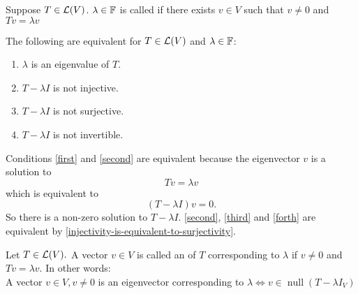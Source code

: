 \begin{mydef} [eigenvalue]
  Suppose $T\in \mathcal{L} (V)$. $\lambda \in \mathbb{F}$ is called  if there exists $v \in V$ such that $v \neq 0$ and $Tv = \lambda v$
\end{mydef}

\setcounter{thm}{6}
\begin{thm} 
  \label{thm: equivalent conditions to be an eigenvalue}
  The following are equivalent for $T \in \mathcal{L}(V)$ and $\lambda \in \mathbb{F}$:
  \begin{enumerate}[label=\textbf{(\alph*)}]
    \item $\lambda$ is an eigenvalue of $T$. \label{first}
    \item $T-\lambda I$ is not injective. \label{second}
    \item $T-\lambda I$ is not surjective. \label{third}
    \item $T-\lambda I$ is not invertible. \label{forth}
  \end{enumerate}
\end{thm}
\begin{prf}
  Conditions \ref{first} and \ref{second} are equivalent because the eigenvector $v$ is a solution to
  \begin{equation}
    Tv=\lambda v
  \end{equation} which is equivalent to
  \begin{equation}
    (T-\lambda I)v=0.
  \end{equation} So there is a non-zero solution to $T-\lambda I$.
  \ref{second}, \ref{third} and \ref{forth} are equivalent by \ref{injectivity-is-equivalent-to-surjectivity}.
\end{prf}

\setcounter{thm}{7}
\begin{mydef} [eigenvector]
  Let $T\in \mathcal{L}(V).$ A vector $v \in V$ is called an  of $T$ corresponding to $\lambda$ if $v\neq 0$ and $Tv = \lambda v$.
  In other words:
  \\A vector $v\in V, v \neq 0$ is an eigenvector corresponding to $\lambda \iff v \in \operatorname{null}(T-\lambda I_V)$
\end{mydef}

